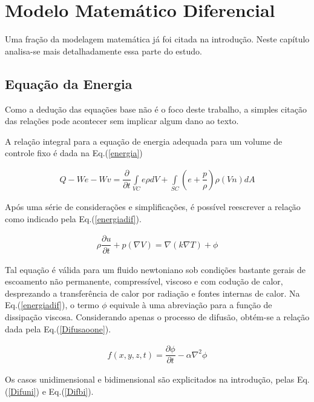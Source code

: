 
\chapter{Modelo Matemático Diferencial}

\noindent
	
	Uma fração da modelagem matemática já foi citada na introdução. Neste capítulo analisa-se mais detalhadamente essa parte do estudo.
	
\section{Equação da Energia}

\noindent
	
	Como a dedução das equações base não é o foco deste trabalho, a simples citação das relações pode acontecer sem implicar algum dano ao texto.
	
	A relação integral para a equação de energia adequada para um volume de controle fixo é dada na Eq.(\ref{energia})
	
\begin{align}
\label{energia}
Q - We - Wv = \dfrac{\partial}{\partial t}\int\limits_{VC} e \rho dV + \int\limits_{SC}\left(e+\dfrac{p}{\rho}\right) \rho (V n) dA
\end{align}	
	
	Após uma série de considerações e simplificações, é possível reescrever a relação como indicado pela Eq.(\ref{energiadif}).
	
\begin{align}
\label{energiadif}
\rho \dfrac{\partial u}{\partial t} + p (\nabla V) = \nabla (k \nabla T)+ \phi
\end{align}

	Tal equação é válida para um fluido newtoniano sob condições bastante gerais de escoamento não permanente, compressível, viscoso e com codução de calor, desprezando a transferência de calor por radiação e fontes internas de calor. Na Eq.(\ref{energiadif}), o termo $\phi$ equivale à uma abreviação para a função de dissipação viscosa.
	Considerando apenas o processo de difusão, obtém-se a relação dada pela Eq.(\ref{Difusaoone}).

\begin{align}
 \label{Difusao}
 f(x,y,z,t) = \dfrac{\partial \phi}{\partial t} - \alpha \nabla^2 \phi
\end{align}	

\newpage

	Os casos unidimensional e bidimensional são explicitados na introdução, pelas Eq. (\ref{Difuni}) e Eq.(\ref{Difbi}).
	

